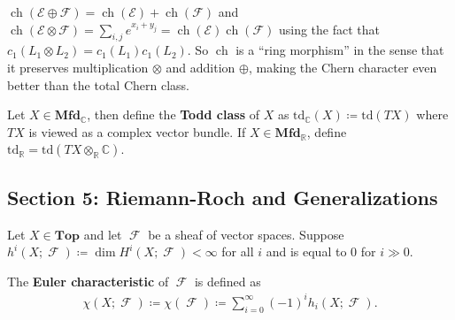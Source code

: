 \begin{remark}

\(\operatorname{ch}(\mathcal{E} \oplus \mathcal{F}) = \operatorname{ch}(\mathcal{E}) + \operatorname{ch}(\mathcal{F})\)
and
\(\operatorname{ch}( \mathcal{E} \otimes\mathcal{F} ) = \sum_{i,j} e^{x_i + y_j} = \operatorname{ch}( \mathcal{E} ) \operatorname{ch}(\mathcal{F} )\)
using the fact that \(c_1(L_1 \otimes L_2) = c_1(L_1) c_1(L_2)\). So
\(\operatorname{ch}\) is a ``ring morphism'' in the sense that it
preserves multiplication \(\otimes\) and addition \(\oplus\), making the
Chern character even better than the total Chern class.

\end{remark}

\begin{definition}

Let \(X \in {\mathbf{Mfd}}_{\mathbb{C}}\), then define the \textbf{Todd
class} of \(X\) as
\(\mathrm{td}_{\mathbb{C}}(X) \coloneqq\mathrm{td}(TX)\) where \(TX\) is
viewed as a complex vector bundle. If
\(X\in {\mathbf{Mfd}}_{\mathbb{R}}\), define
\(\mathrm{td}_{\mathbb{R}}= \mathrm{td}(TX \otimes_{\mathbb{R}}{\mathbb{C}})\).

\end{definition}

\hypertarget{section-5-riemann-roch-and-generalizations}{%
\subsection{Section 5: Riemann-Roch and
Generalizations}\label{section-5-riemann-roch-and-generalizations}}

\begin{remark}

Let \(X\in {\mathbf{Top}}\) and let \(\operatorname{\mathcal{F}}\) be a
sheaf of vector spaces. Suppose
\(h^i(X; \operatorname{\mathcal{F}}) \coloneqq\dim H^i(X; \operatorname{\mathcal{F}}) < \infty\)
for all \(i\) and is equal to 0 for \(i \gg 0\).

\end{remark}

\begin{definition}

The \textbf{Euler characteristic} of \(\operatorname{\mathcal{F}}\) is
defined as
\begin{align*}
\chi(X; \operatorname{\mathcal{F}}) \coloneqq\chi(\operatorname{\mathcal{F}}) \coloneqq\sum_{i=0}^{\infty } (-1)^i h_i(X; \operatorname{\mathcal{F}} )
.\end{align*}

\end{definition}

